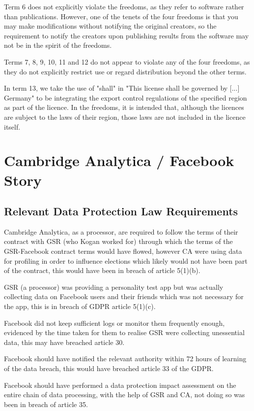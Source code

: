 \documentclass[a4wide, 11pt]{article}
\begin{document}
Term 6 does not explicitly violate the freedoms, as they refer to software rather than publications. However, one of the tenets of the four freedoms is that you may make modifications without notifying the original creators, so the requirement to notify the creators upon publishing results from the software may not be in the spirit of the freedoms.

Terms 7, 8, 9, 10, 11 and 12 do not appear to violate any of the four freedoms, as they do not explicitly restrict use or regard distribution beyond the other terms.

In term 13, we take the use of "shall" in "This license shall be governed by [...] Germany" to be integrating the export control regulations of the specified region as part of the licence. In the freedoms, it is intended that, although the licences are subject to the laws of their region, those laws are not included in the licence itself.

\section{Cambridge Analytica / Facebook Story}

\subsection{Relevant Data Protection Law Requirements}

Cambridge Analytica, as a processor, are required to follow the terms of their contract with GSR (who Kogan worked for) through which the terms of the GSR-Facebook contract terms would have flowed, however CA were using data for profiling in order to influence elections which likely would not have been part of the contract, this would have been in breach of article 5(1)(b).

GSR (a processor) was providing a personality test app but was actually collecting data on Facebook users and their friends which was not necessary for the app, this is in breach of GDPR article 5(1)(c).

Facebook did not keep sufficient logs or monitor them frequently enough, evidenced by the time taken for them to realise GSR were collecting unessential data, this may have breached article 30.

Facebook should have notified the relevant authority within 72 hours of learning of the data breach, this would have breached article 33 of the GDPR.

Facebook should have performed a data protection impact assessment on the entire chain of data processing, with the help of GSR and CA, not doing so was been in breach of article 35.
\end{document}
